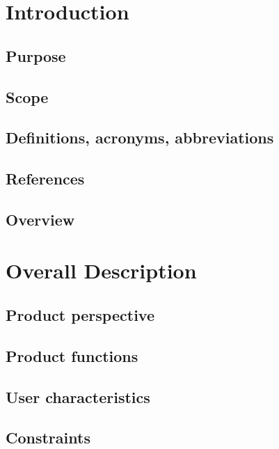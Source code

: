 \documentclass{book}
\begin{document}

\chapter{Introduction} \label{c:intro}
\section{Purpose}
\section{Scope}
\section{Definitions, acronyms, abbreviations}
\section{References}
\section{Overview}

\chapter{Overall Description} \label{c:descr}
\section{Product perspective}
\section{Product functions}
\section{User characteristics}
\section{Constraints}
\end{document}
